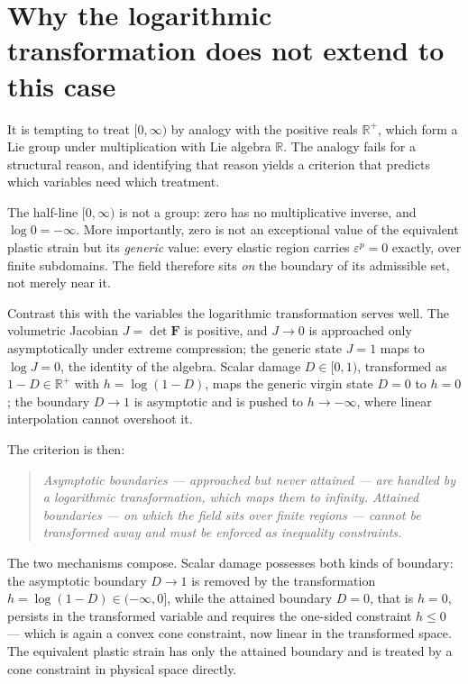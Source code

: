 \documentclass[11pt]{article}
\newcommand{\bs}[1]{\boldsymbol{#1}}
\begin{document}
\section{Why the logarithmic transformation does not extend to this case}
\label{sec:limits}

It is tempting to treat $[0,\infty)$ by analogy with the positive reals
$\mathbb{R}^+$, which form a Lie group under multiplication with Lie
algebra $\mathbb{R}$. The analogy fails for a structural reason, and
identifying that reason yields a criterion that predicts which variables
need which treatment.

The half-line $[0,\infty)$ is not a group: zero has no multiplicative
inverse, and $\log 0 = -\infty$. More importantly, zero is not an
exceptional value of the equivalent plastic strain but its \emph{generic}
value: every elastic region carries $\varepsilon^p = 0$ exactly, over
finite subdomains. The field therefore sits \emph{on} the boundary of its
admissible set, not merely near it.

Contrast this with the variables the logarithmic transformation serves
well. The volumetric Jacobian $J = \det \bs{F}$ is positive, and
$J \to 0$ is approached only asymptotically under extreme compression;
the generic state $J = 1$ maps to $\log J = 0$, the identity of the
algebra. Scalar damage $D \in [0,1)$, transformed as
$1 - D \in \mathbb{R}^+$ with $h = \log(1 - D)$, maps the generic
virgin state $D = 0$ to $h = 0$; the boundary $D \to 1$ is asymptotic
and is pushed to $h \to -\infty$, where linear interpolation cannot
overshoot it.

The criterion is then:
\begin{quote}
\emph{Asymptotic boundaries --- approached but never attained --- are
handled by a logarithmic transformation, which maps them to infinity.
Attained boundaries --- on which the field sits over finite regions ---
cannot be transformed away and must be enforced as inequality
constraints.}
\end{quote}
The two mechanisms compose. Scalar damage possesses both kinds of
boundary: the asymptotic boundary $D \to 1$ is removed by the
transformation $h = \log(1-D) \in (-\infty, 0]$, while the attained
boundary $D = 0$, that is $h = 0$, persists in the transformed variable
and requires the one-sided constraint $h \leq 0$ --- which is again a
convex cone constraint, now linear in the transformed space. The
equivalent plastic strain has only the attained boundary and is treated
by a cone constraint in physical space directly.
\end{document}
